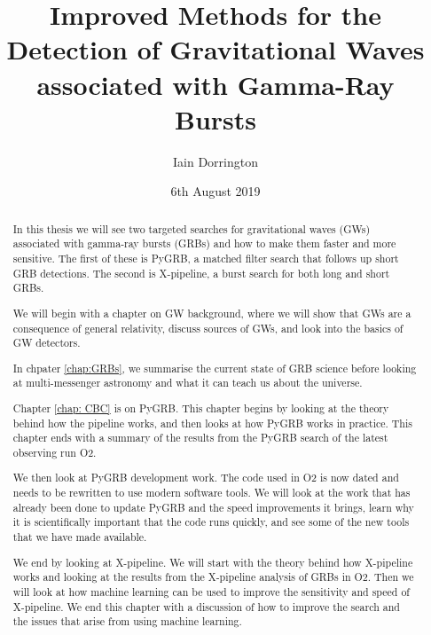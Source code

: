 \documentclass[11pt]{cuthesis}
\title{Improved Methods for the Detection of Gravitational Waves associated with Gamma-Ray Bursts}
\author{Iain Dorrington}
\date{6th August 2019}
\newcommand{\xp}{X-pipeline }
\newcommand{\xpc}{X-pipeline, }
\newcommand{\xpfs}{X-pipeline. }
\begin{document}

\maketitle

\frontmatter

\begin{abstract}

In this thesis we will see two targeted searches for gravitational waves (GWs) associated with gamma-ray bursts (GRBs) and how to make them faster and more sensitive. The first of these is PyGRB, a matched filter search that follows up short GRB detections. The second is  \xpc a burst search for both long and short GRBs.                                  

We will begin with a chapter on GW background, where we will show that GWs are a consequence of general relativity, discuss  sources of GWs, and look into the basics of GW detectors.

In chpater \ref{chap:GRBs}, we summarise the current state of GRB science before looking at multi-messenger astronomy and what it can teach us about the universe.

Chapter \ref{chap: CBC} is on PyGRB. This chapter begins by looking at the theory behind how the pipeline works, and then looks at how PyGRB works in practice. This chapter ends with a summary of the results from the PyGRB search of the latest observing run O2.

We then look at PyGRB development work. The code used in O2 is now dated and needs to be rewritten to use modern software tools. We will look at the work that has already been done to update PyGRB and the speed improvements it brings, learn why it is scientifically important that the code runs quickly, and see some of the new tools that we have made available.

We end by looking at \xpfs We will start with the theory behind how \xp works and looking at the results from the \xp analysis of GRBs in O2. Then we will look at how machine learning can be used to improve the sensitivity and speed of \xpfs We end this chapter with a discussion of how to improve the search and the issues that arise from using machine learning. 
\end{abstract}


\tableofcontents
\listoffigures
\listoftables
\end{document}
